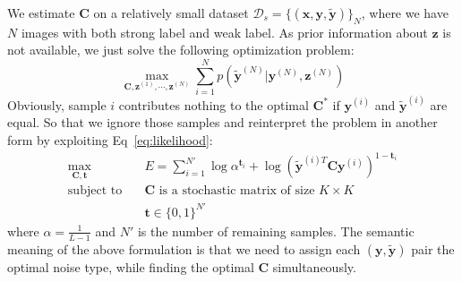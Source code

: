 \documentclass[10pt,twocolumn,letterpaper]{article}
\def\vec{\mathbf}
\def\mat{\mathbf}
\begin{document}
We estimate $\mat{C}$ on a relatively small dataset $\mathcal{D}_s = \{(\vec{x},\vec{y},\tilde{\vec{y}})\}_N$, where we have $N$ images with both strong label and weak label. As prior information about $\vec{z}$ is not available, we just solve the following optimization problem:
\begin{equation}
    \max_{\mat{C},\vec{z}^{(1)},\cdots,\vec{z}^{(N)}} \sum_{i=1}^N p(\tilde{\vec{y}}^{(N)}|\vec{y}^{(N)},\vec{z}^{(N)})
\end{equation}
Obviously, sample $i$ contributes nothing to the optimal $\mat{C}^*$ if $\vec{y}^{(i)}$ and $\tilde{\vec{y}}^{(i)}$ are equal. So that we ignore those samples and reinterpret the problem in another form by exploiting Eq~\ref{eq:likelihood}:
\begin{equation}
\begin{aligned}
\max_{\mat{C},\vec{t}} \quad & E=\sum_{i=1}^{N'} \log \alpha^{\vec{t}_i} + \log (\tilde{\vec{y}}^{(i)T} \mat{C} \vec{y}^{(i)})^{1-\vec{t}_i}\\
\text{subject to} \quad & \mat{C} \text{ is a stochastic matrix of size } K\times K \\
                    & \vec{t} \in \{0,1\}^{N'}
\end{aligned}
\end{equation}
where $\alpha=\frac{1}{L-1}$ and $N'$ is the number of remaining samples. The semantic meaning of the above formulation is that we need to assign each $(\vec{y},\tilde{\vec{y}})$ pair the optimal noise type, while finding the optimal $\mat{C}$ simultaneously.
\end{document}
